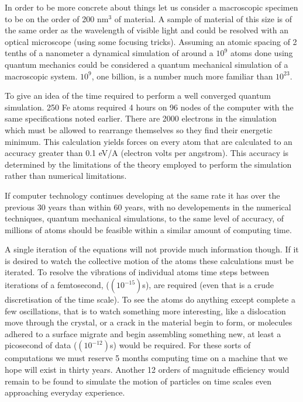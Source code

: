 In order to be more concrete about things let us consider a  macroscopic specimen 
to be on the order of 200 nm$^{3}$ of material. A sample of material of this size is of the 
same order as the wavelength of visible light and could be
resolved with an optical microscope (using some focusing tricks). Assuming an atomic spacing of 2 tenths 
of a nanometer a dynamical simulation of around a $10^{9}$ atoms 
done using quantum mechanics could be considered a quantum mechanical 
simulation of a macroscopic system. $10^{9}$, one billion, is a number
much more familiar than $10^{23}$.

To give an idea of the time required to perform a well converged quantum simulation. 
250 Fe atoms required 4 hours on 96 nodes of the computer with the same 
specifications noted earlier. There are 2000 electrons in the 
simulation which must be allowed
to rearrange themselves so they find their energetic minimum. 
This calculation yields forces on every 
atom that are calculated to an accuracy greater 
than 0.1 eV/A (electron volts per angstrom).
This accuracy is determined by the limitations 
of the theory employed to perform the simulation
rather than numerical limitations.

If computer technology continues developing at the same rate it has
over the previous 30 years than within 60 years, with 
no developements in the numerical techniques, 
quantum mechanical simulations, to the same level 
of accuracy, of millions of atoms should be feasible within a 
similar amount of computing time. 

A single iteration of the equations will not provide much information though.
If it is desired to watch the collective 
motion of the atoms these calculations must be iterated.
To resolve the vibrations of individual atoms  
time steps between iterations of a femtosecond, ($(10^{-15})$s),
are required (even that is a crude discretisation of the time scale). 
To see the atoms do anything except complete a few oscillations, 
that is to watch something more interesting, like a dislocation
move through the crystal, or a crack in the material begin to form,
or molecules adhered to a surface migrate and begin assembling something new,
at least a picosecond of data ($(10^{-12})$s) would be required.
For these sorts of computations we must reserve 5 months computing time 
on a machine that we hope will exist in thirty years. Another 12 orders of magnitude 
efficiency would remain to be found to simulate the motion 
of particles on time scales even approaching everyday experience.

